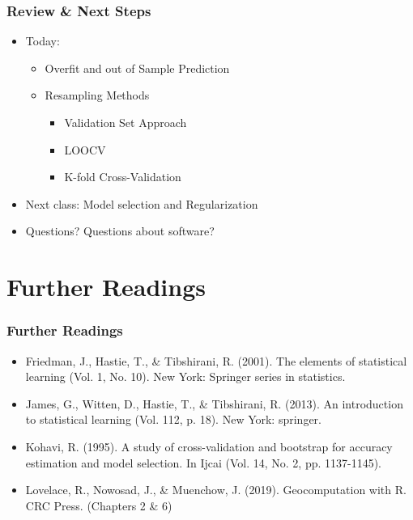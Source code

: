 \documentclass[
  shownotes,
  xcolor={svgnames},
  hyperref={colorlinks,citecolor=DarkBlue,linkcolor=DarkRed,urlcolor=DarkBlue}
  ]{beamer}
\begin{document}
\begin{frame}
\frametitle{Review \& Next Steps}
  
\begin{itemize} 
    \item Today:
    \medskip
    \begin{itemize} 
         \item Overfit and out of Sample Prediction
         \medskip
         \item Resampling Methods 
        \begin{itemize}  
            \item Validation Set Approach 
            \medskip
            \item LOOCV
            \medskip
            \item K-fold Cross-Validation
      \end{itemize}
    \end{itemize}
  	\bigskip  

	\item  Next class: Model selection and Regularization


\bigskip  
\item Questions? Questions about software? 

\end{itemize}
\end{frame}

\section{Further Readings}
\begin{frame}
\frametitle{Further Readings}

\begin{itemize}


  \item Friedman, J., Hastie, T., \& Tibshirani, R. (2001). The elements of statistical learning (Vol. 1, No. 10). New York: Springer series in statistics.
  \medskip
  \item James, G., Witten, D., Hastie, T., \& Tibshirani, R. (2013). An introduction to statistical learning (Vol. 112, p. 18). New York: springer.
  \medskip
    \item Kohavi, R. (1995). A study of cross-validation and bootstrap for accuracy estimation and model selection. In Ijcai (Vol. 14, No. 2, pp. 1137-1145).
  \medskip
  \item Lovelace, R., Nowosad, J., \& Muenchow, J. (2019). Geocomputation with R. CRC Press. (Chapters 2 \& 6)
\end{itemize}

\end{frame}






\end{document}
